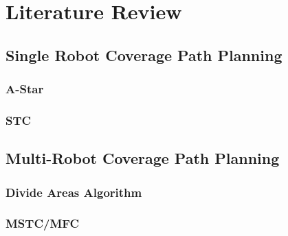 \chapter{Literature Review}
\label{chp:back}


\section{Single Robot Coverage Path Planning}
\subsection{A-Star}
\subsection{STC}
\section{Multi-Robot Coverage Path Planning}

\subsection{Divide Areas Algorithm}
\subsection{MSTC/MFC}




